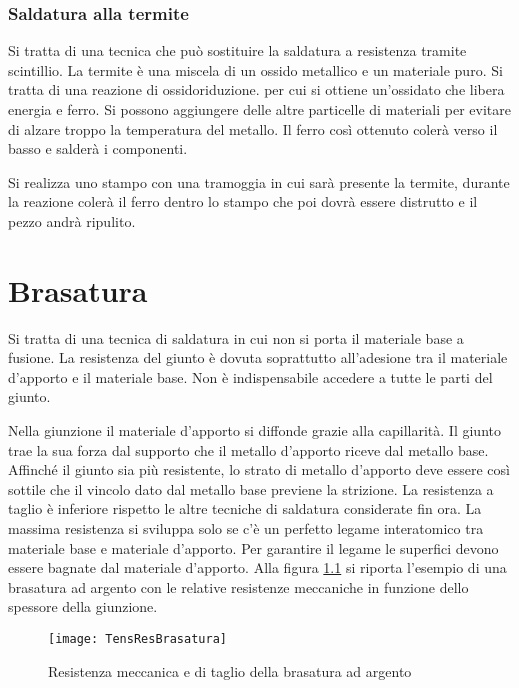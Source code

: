 
\subsection{Saldatura alla termite}
Si tratta di una tecnica che può sostituire la saldatura a resistenza tramite scintillio.
La termite è una miscela di un ossido metallico e un materiale puro.
Si tratta di una reazione di ossidoriduzione. per cui si ottiene un'ossidato che libera energia e ferro. Si possono aggiungere delle altre particelle di materiali per evitare di alzare troppo la temperatura del metallo.
Il ferro così ottenuto colerà verso il basso e salderà i componenti.

Si realizza uno stampo con una tramoggia in cui sarà presente la termite, durante la reazione colerà il ferro dentro lo stampo che poi dovrà essere distrutto e il pezzo andrà ripulito.

\chapter{Brasatura}
Si tratta di una tecnica di saldatura in cui non si porta il materiale base a fusione. La resistenza del giunto è dovuta soprattutto all'adesione tra il materiale d'apporto e il materiale base.
Non è indispensabile accedere a tutte le parti del giunto.

Nella giunzione il materiale d'apporto si diffonde grazie alla capillarità.
Il giunto trae la sua forza dal supporto che il metallo d'apporto riceve dal metallo base.
Affinché il giunto sia più resistente, lo strato di metallo d'apporto deve essere così sottile che il vincolo dato dal metallo base previene la strizione.
La resistenza a taglio è inferiore rispetto le altre tecniche di saldatura considerate fin ora.
La massima resistenza si sviluppa solo se c'è un perfetto legame interatomico tra materiale base e materiale d'apporto.
Per garantire il legame le superfici devono essere bagnate dal materiale d'apporto.
Alla figura \ref{fig:TensResBrasatura} si riporta l'esempio di una brasatura ad argento con le relative resistenze meccaniche in funzione dello spessore della giunzione.

\begin{figure}
\centering
\texttt{[image: TensResBrasatura]}
\caption{Resistenza meccanica e di taglio della brasatura ad argento}
\label{fig:TensResBrasatura}
\end{figure}

